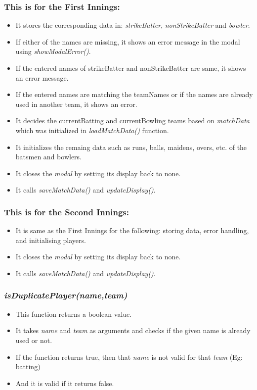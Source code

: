 \documentclass[a4paper,12pt]{article}
\begin{document}
\subsubsection*{This is for the First Innings:}
\begin{itemize}
\item It stores the corresponding data in: \textit{strikeBatter}, \textit{nonStrikeBatter} and \textit{bowler}.
\item If either of the names are missing, it shows an error message in the modal using \textit{showModalError()}.
\item If the entered names of strikeBatter and nonStrikeBatter are same, it shows an error message. 
\item If the entered names are matching the teamNames or if the names are already used in another team, it shows an error.
\item It decides the currentBatting and currentBowling teams based on \textit{matchData} which was initialized in \textit{loadMatchData()} function.
\item It initializes the remaing data such as runs, balls, maidens, overs, etc. of the batsmen and bowlers.
\item It closes the \textit{modal} by setting its display back to none.
\item It calls \textit{saveMatchData()} and \textit{updateDisplay()}.
\end{itemize} 

\subsubsection*{This is for the Second Innings:}
\begin{itemize}
\item It is same as the First Innings for the following: storing data, error handling, and initialising players.
\item It closes the \textit{modal} by setting its display back to none.
\item It calls \textit{saveMatchData()} and \textit{updateDisplay()}.
\end{itemize}

\subsubsection{\textit{isDuplicatePlayer(name,team)}}
\begin{itemize}
\item This function returns a boolean value.
\item It takes \textit{name} and \textit{team} as arguments and checks if the given name is already used or not.
\item If the function returns true, then that \textit{name} is not valid for that \textit{team} (Eg: batting)
\item And it is valid if it returns false.
\end{itemize}
\end{document}
